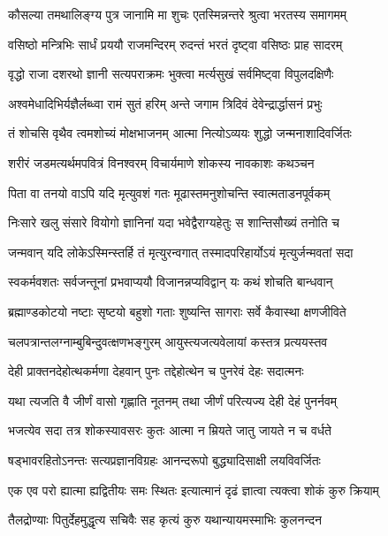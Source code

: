 \twolineshloka
{कौसल्या तमथालिङ्ग्य पुत्र जानामि मा शुचः}
{एतस्मिन्नन्तरे श्रुत्वा भरतस्य समागमम्} %

\twolineshloka
{वसिष्ठो मन्त्रिभिः सार्धं प्रययौ राजमन्दिरम्}
{रुदन्तं भरतं दृष्ट्वा वसिष्ठः प्राह सादरम्} %

\twolineshloka
{वृद्धो राजा दशरथो ज्ञानी सत्यपराक्रमः}
{भुक्त्वा मर्त्यसुखं सर्वमिष्ट्वा विपुलदक्षिणैः} %

\twolineshloka
{अश्वमेधादिभिर्यज्ञैर्लब्ध्वा रामं सुतं हरिम्}
{अन्ते जगाम त्रिदिवं देवेन्द्रार्द्धासनं प्रभुः} %

\twolineshloka
{तं शोचसि वृथैव त्वमशोच्यं मोक्षभाजनम्}
{आत्मा नित्योऽव्ययः शुद्धो जन्मनाशादिवर्जितः} %

\twolineshloka
{शरीरं जडमत्यर्थमपवित्रं विनश्वरम्}
{विचार्यमाणे शोकस्य नावकाशः कथञ्चन} %

\twolineshloka
{पिता वा तनयो वाऽपि यदि मृत्युवशं गतः}
{मूढास्तमनुशोचन्ति स्वात्मताडनपूर्वकम्} %

\twolineshloka
{निःसारे खलु संसारे वियोगो ज्ञानिनां यदा}
{भवेद्वैराग्यहेतुः स शान्तिसौख्यं तनोति च} %

\twolineshloka
{जन्मवान् यदि लोकेऽस्मिन्स्तर्हि तं मृत्युरन्वगात्}
{तस्मादपरिहार्योऽयं मृत्युर्जन्मवतां सदा} %

\twolineshloka
{स्वकर्मवशतः सर्वजन्तूनां प्रभवाप्ययौ}
{विजानन्नप्यविद्वान् यः कथं शोचति बान्धवान्} %

\twolineshloka
{ब्रह्माण्डकोटयो नष्टाः सृष्टयो बहुशो गताः}
{शुष्यन्ति सागराः सर्वे कैवास्था क्षणजीविते} %

\twolineshloka
{चलपत्रान्तलग्नाम्बुबिन्दुवत्क्षणभङ्गुरम्}
{आयुस्त्यजत्यवेलायां कस्तत्र प्रत्ययस्तव} %

\twolineshloka
{देही प्राक्तनदेहोत्थकर्मणा देहवान् पुनः}
{तद्देहोत्थेन च पुनरेवं देहः सदात्मनः} %

\twolineshloka
{यथा त्यजति वै जीर्णं वासो गृह्णाति नूतनम्}
{तथा जीर्णं परित्यज्य देही देहं पुनर्नवम्} %

\twolineshloka
{भजत्येव सदा तत्र शोकस्यावसरः कुतः}
{आत्मा न म्रियते जातु जायते न च वर्धते} %

\twolineshloka
{षड्भावरहितोऽनन्तः सत्यप्रज्ञानविग्रहः}
{आनन्दरूपो बुद्ध्यादिसाक्षी लयविवर्जितः} %

\twolineshloka
{एक एव परो ह्यात्मा ह्यद्वितीयः समः स्थितः}
{इत्यात्मानं दृढं ज्ञात्वा त्यक्त्वा शोकं कुरु क्रियाम्} %

\twolineshloka
{तैलद्रोण्याः पितुर्देहमुद्धृत्य सचिवैः सह}
{कृत्यं कुरु यथान्यायमस्माभिः कुलनन्दन} %

